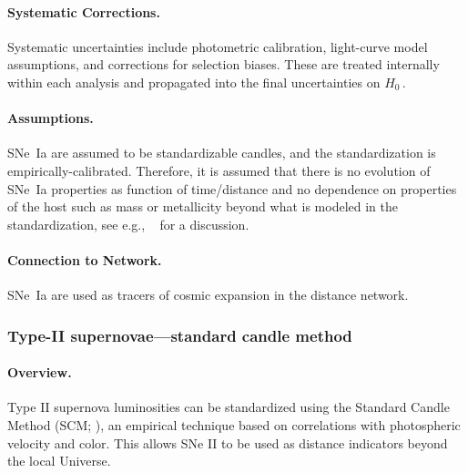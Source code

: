 \paragraph{Systematic Corrections.}
Systematic uncertainties include photometric calibration, light-curve model assumptions, and corrections for selection biases. These are treated internally within each analysis and propagated into the final uncertainties on $H_0$\,.

\paragraph{Assumptions.} SNe~Ia are assumed to be standardizable candles, and the standardization is empirically-calibrated. Therefore, it is assumed that there is no evolution of SNe~Ia properties  as function of time/distance and no dependence on properties of the host such as mass or metallicity  beyond what is modeled in the standardization, see e.g., ~\cite{2023ApJ...951...22J} for a discussion. 

\paragraph{Connection to Network.} SNe~Ia are used as tracers of cosmic expansion in the distance network. 


\subsubsection{Type-II supernovae---standard candle method} \label{sec:data:snii_SC}

\paragraph{Overview.}
Type II supernova luminosities can be standardized using the Standard Candle Method (SCM; \citealt{2002ApJ...566L..63H}), an empirical technique based on correlations with photospheric velocity and color. This allows SNe II to be used as distance indicators beyond the local Universe. 

